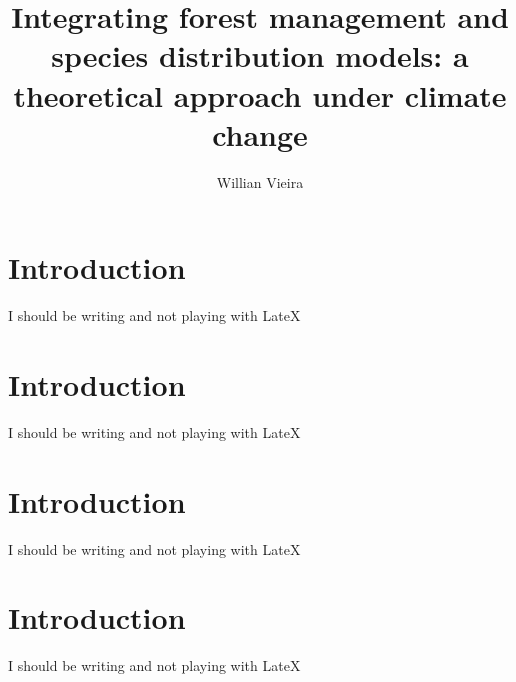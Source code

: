 \documentclass[12pt]{article}
\begin{document}
\title{Integrating forest management and species distribution models: a theoretical approach under climate change}

\author{Willian Vieira}

\maketitle

\section{Introduction}
I should be writing and not playing with LateX
\section{Introduction}

I should be writing and not playing with LateX

\section{Introduction}
I should be writing and not playing with LateX

\section{Introduction}
I should be writing and not playing with LateX
\end{document}
